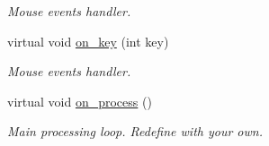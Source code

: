 \begin{DoxyCompactItemize}
\begin{DoxyCompactList}\small\item\em Mouse events handler. \end{DoxyCompactList}\item 
\hypertarget{classvideo_a8c940ba6528c2c488b7ea3c9cc6e531e}{}virtual void \hyperlink{classvideo_a8c940ba6528c2c488b7ea3c9cc6e531e}{on\+\_\+key} (int key)\label{classvideo_a8c940ba6528c2c488b7ea3c9cc6e531e}

\begin{DoxyCompactList}\small\item\em Mouse events handler. \end{DoxyCompactList}\item 
\hypertarget{classvideo_a9cd55e23921c925eb2c912e40df96d05}{}virtual void \hyperlink{classvideo_a9cd55e23921c925eb2c912e40df96d05}{on\+\_\+process} ()\label{classvideo_a9cd55e23921c925eb2c912e40df96d05}

\begin{DoxyCompactList}\small\item\em Main processing loop. Redefine with your own. \end{DoxyCompactList}\end{DoxyCompactItemize}
